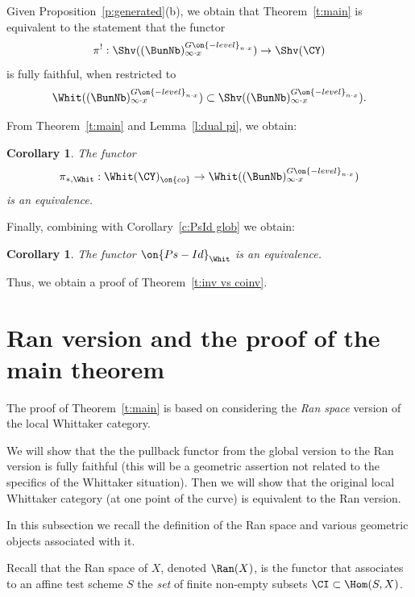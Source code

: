 \documentclass[9pt]{amsart}
\newtheorem{cor}[subsubsection]{Corollary}
\theoremstyle{definition}
\theoremstyle{remark}
\newcommand{\thmref}[1]{Theorem~\ref{#1}}
\newcommand{\lemref}[1]{Lemma~\ref{#1}}
\newcommand{\propref}[1]{Proposition~\ref{#1}}
\newcommand{\corref}[1]{Corollary~\ref{#1}}
\numberwithin{equation}{section}
\begin{document}
\medskip

Given \propref{p:generated}(b), we obtain that \thmref{t:main} is equivalent to the statement that the functor 
$$\pi^!:\Shv((\BunNb)^{G\on{-level}_{n\cdot x}}_{\infty\cdot x})\to \Shv(\CY)$$
is fully faithful, when restricted to 
$$\Whit((\BunNb)^{G\on{-level}_{n\cdot x}}_{\infty\cdot x})\subset \Shv((\BunNb)^{G\on{-level}_{n\cdot x}}_{\infty\cdot x}).$$

\sssec{}

From \thmref{t:main} and \lemref{l:dual pi}, we obtain:

\begin{cor}
The functor 
$$\pi_{*,\Whit}:\Whit(\CY)_{\on{co}}\to \Whit((\BunNb)^{G\on{-level}_{n\cdot x}}_{\infty\cdot x})$$
is an equivalence.
\end{cor} 

Finally, combining with \corref{c:PsId glob} we obtain:

\begin{cor}  \label{c:inv vs coinv}
The functor $\on{Ps-Id}_{\Whit}$ is an equivalence.
\end{cor} 

Thus, we obtain a proof of \thmref{t:inv vs coinv}. 

\section{Ran version and the proof of the main theorem}  \label{s:Ran}

The proof of \thmref{t:main} is based on considering the \emph{Ran space} version of the local
Whittaker category. 

\medskip

We will show that the the pullback functor from the global version
to the Ran version is fully faithful (this will be a geometric assertion not related to the
specifics of the Whittaker situation). Then we will show that the original local Whittaker
category (at one point of the curve) is equivalent to the Ran version. 


In this subsection we recall the definition of the Ran space and various geometric objects associated with it. 

\sssec{}

Recall that the Ran space of $X$, denoted $\Ran(X)$, is the functor that associates to an affine test scheme $S$
the \emph{set} of finite non-empty subsets $\CI\subset \Hom(S,X)$. 
\end{document}
